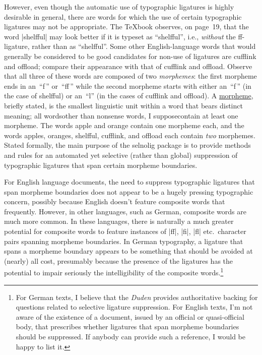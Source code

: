 \documentclass[11pt]{article}
\newcommand{\pkg}[1]{\textsf{#1}}
\newcommand{\uselig}[1]{\selnoligoff\mbox{#1}\selnoligon}
\begin{document}
However, even though the automatic use of typographic ligatures is highly desirable in general, there are words for which the use of certain typographic ligatures may not be appropriate. The \TeX book observes, on page~19, that the word |shelfful| may look better if it is typeset as \enquote{shelfful}, i.e., \emph{without} the ff-ligature, rather than as \enquote{\uselig{shelfful}}. Some other English-language words that would generally be considered to be good candidates for non-use of ligatures are \uselig{cufflink} and \uselig{offload}; compare their appearance with that of cufflink and offload. Observe that all three of these words are composed of two \emph{morphemes}: the first morpheme ends in an~\enquote{f\,} or~\enquote{ff\,} while the second morpheme starts with either an~\enquote{f\,} (in the case of shelfful) or an~\enquote{l} (in the cases of cufflink and offload). A \href{http://en.wikipedia.org/wiki/Morpheme}{morpheme}, briefly stated, is the smallest linguistic unit within a word that bears distinct meaning; all words\textemdash other than nonsense words, I suppose\textemdash contain at least one morpheme. The words apple and orange contain one morpheme each, and the words apples, oranges, shelfful, cufflink, and offload each contain \emph{two} morphemes. Stated formally, the main purpose of the \pkg{selnolig} package is to provide methods and rules for an automated yet selective (rather than global) suppression of typographic ligatures that span certain morpheme boundaries.

For English language documents, the need to suppress typographic ligatures that span morpheme boundaries does not appear to be a hugely pressing typographic concern, possibly because English doesn't feature composite words that frequently. However, in other languages, such as German, composite words are much more common. In these languages, there is naturally a much greater potential for composite words to feature instances of |ff|, |fi|, |fl| etc.\ character pairs spanning morpheme boundaries. In German typography, a ligature that spans a morpheme boundary appears to be something that should be avoided at (nearly) all cost, presumably because the presence of the ligatures has the potential to impair seriously the intelligibility of the composite words.\footnote{For German texts, I believe that the \emph{Duden} provides authoritative backing for questions related to selective ligature suppression. For English texts, I'm not aware of the existence of a document, issued by an official or quasi-official body, that prescribes whether ligatures that span morpheme boundaries should be suppressed. If anybody can provide such a reference, I would be happy to list it.}
\end{document}
